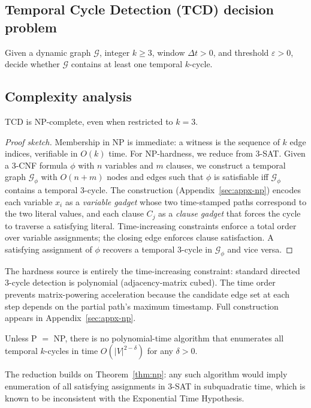 \documentclass[journal,onecolumn]{IEEEtran}
\newcommand{\G}{\mathcal{G}}
\newcommand{\eps}{\varepsilon}
\begin{document}
\subsection{Temporal Cycle Detection (TCD) decision problem}
\label{sec:theory-tcd}

\begin{definition}[TCD]
Given a dynamic graph $\G$, integer $k \geq 3$, window $\Delta t > 0$, and
threshold $\eps > 0$, decide whether $\G$ contains at least one temporal
$k$-cycle.
\end{definition}

\subsection{Complexity analysis}
\label{sec:theory-complexity}

\begin{theorem}
\label{thm:np}
TCD is NP-complete, even when restricted to $k = 3$.
\end{theorem}
\begin{proof}[Proof sketch]
Membership in NP is immediate: a witness is the sequence of $k$ edge
indices, verifiable in $O(k)$ time. For NP-hardness, we reduce from 3-SAT.
Given a 3-CNF formula $\phi$ with $n$ variables and $m$ clauses, we
construct a temporal graph $\G_\phi$ with $O(n+m)$ nodes and edges such
that $\phi$ is satisfiable iff $\G_\phi$ contains a temporal 3-cycle. The
construction (Appendix~\ref{sec:appx-np}) encodes each variable $x_i$ as a
\emph{variable gadget} whose two time-stamped paths correspond to the two
literal values, and each clause $C_j$ as a \emph{clause gadget} that
forces the cycle to traverse a satisfying literal. Time-increasing
constraints enforce a total order over variable assignments; the closing
edge enforces clause satisfaction. A satisfying assignment of $\phi$
recovers a temporal 3-cycle in $\G_\phi$ and vice versa.
\end{proof}

The hardness source is entirely the time-increasing constraint: standard
directed 3-cycle detection is polynomial (adjacency-matrix cubed). The
time order prevents matrix-powering acceleration because the candidate
edge set at each step depends on the partial path's maximum timestamp.
Full construction appears in Appendix~\ref{sec:appx-np}.

\begin{theorem}
\label{thm:approx}
Unless P $=$ NP, there is no polynomial-time algorithm that enumerates all
temporal $k$-cycles in time $O(|V|^{2-\delta})$ for any $\delta > 0$.
\end{theorem}
The reduction builds on Theorem~\ref{thm:np}: any such algorithm would
imply enumeration of all satisfying assignments in 3-SAT in subquadratic
time, which is known to be inconsistent with the Exponential Time Hypothesis.
\end{document}
